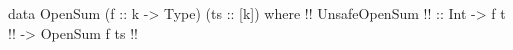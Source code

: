 \begin{code}
data OpenSum (f :: k -> Type) (ts :: [k]) where !!
  UnsafeOpenSum  !!
      :: Int
      -> f t !!
      -> OpenSum f ts !!
\end{code}
